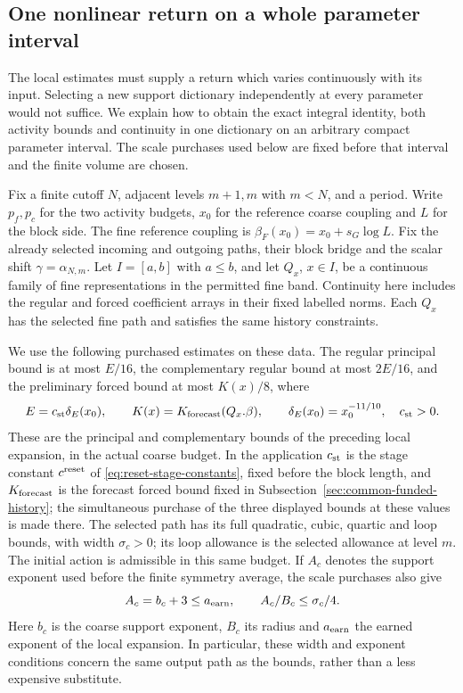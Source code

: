 \subsection{One nonlinear return on a whole parameter interval}
\label{sec:selected-nonlinear-offering}
The local estimates must supply a return which varies continuously with
its input. Selecting a new support dictionary independently at every
parameter would not suffice. We explain how to obtain the exact integral
identity, both activity bounds and continuity in one dictionary on an
arbitrary compact parameter interval. The scale purchases used below are
fixed before that interval and the finite volume are chosen.

Fix a finite cutoff $N$, adjacent levels $m+1,m$ with $m<N$, and a
period. Write $p_f,p_c$ for the two activity budgets, $x_0$ for the
reference coarse coupling and $L$ for the block side. The fine reference
coupling is $\beta_F(x_0)=x_0+s_G\log L$. Fix the already selected
incoming and outgoing paths, their block bridge and the scalar shift
$\gamma=\alpha_{N,m}$. Let $I=[a,b]$ with $a\le b$, and let
$Q_x$, $x\in I$, be a continuous family of fine representations in
the permitted fine band. Continuity here includes the regular and
forced coefficient arrays in their fixed labelled norms. Each $Q_x$
has the selected fine path and satisfies the same history constraints.

We use the following purchased estimates on these data. The regular
principal bound is at most $E/16$, the complementary regular bound at
most $2E/16$, and the preliminary forced bound at most $K(x)/8$, where
\[
 E=c_{\rm st}\delta_E(x_0),\qquad
 K(x)=K_{\rm forecast}(Q_x.\beta),\qquad
 \delta_E(x_0)=x_0^{-11/10},\quad c_{\rm st}>0.
\]
These are the principal and complementary bounds of the preceding local
expansion, in the actual coarse budget. In the application
$c_{\rm st}$ is the stage constant $c^{\rm reset}$ of
\eqref{eq:reset-stage-constants}, fixed before the block length, and
$K_{\rm forecast}$ is the forecast forced bound fixed in
Subsection~\ref{sec:common-funded-history}; the simultaneous purchase of
the three displayed bounds at these values is made there. The selected
path has its full
quadratic, cubic, quartic and loop bounds, with width $\sigma_c>0$;
its loop allowance is the selected allowance at level $m$. The initial
action is admissible in this same budget. If $A_c$ denotes the
support exponent used before the finite symmetry average, the scale
purchases also give
\begin{equation}\label{eq:selected-offer-width}
 A_c=b_c+3\le a_{\rm earn},\qquad A_c/B_c\le\sigma_c/4.
\end{equation}
Here $b_c$ is the coarse support exponent, $B_c$ its radius and
$a_{\rm earn}$ the earned exponent of the local expansion. In particular,
these width and exponent conditions concern the same output path as the
bounds, rather than a less expensive substitute.

